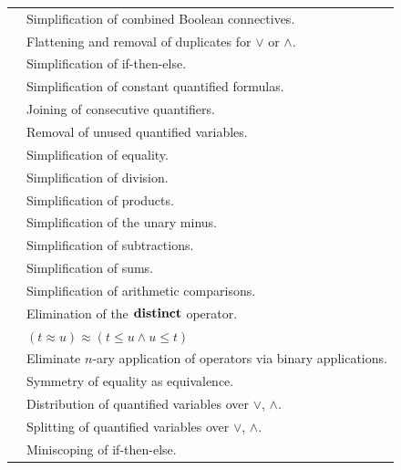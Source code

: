 \begin{xltabular}{\linewidth}{l X}
 & Simplification of combined Boolean connectives. \\
 & Flattening and removal of duplicates for $\lor$ or $\land$. \\
 & Simplification of if-then-else. \\
 & Simplification of constant quantified formulas. \\
 & Joining of consecutive quantifiers. \\
 & Removal of unused quantified variables. \\
 & Simplification of equality. \\
 & Simplification of division. \\
 & Simplification of products. \\
 & Simplification of the unary minus. \\
 & Simplification of subtractions. \\
 & Simplification of sums. \\
 & Simplification of arithmetic comparisons. \\
 & Elimination of the $\mathbf{distinct}$ operator. \\
 & $(t ≈ u) ≈ (t \leq u \land u \leq t)$ \\
 & Eliminate $n$-ary application of operators via binary applications. \\
 & Symmetry of equality as equivalence. \\
 & Distribution of quantified variables over $\lor$, $\land$. \\
      & Splitting of quantified variables over $\lor$, $\land$. \\
        & Miniscoping of if-then-else. \\
\end{xltabular}

